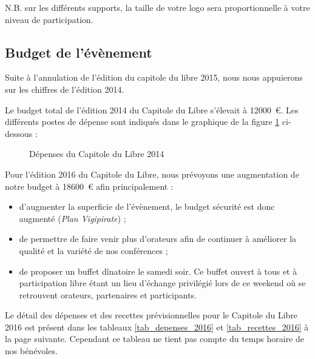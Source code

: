 N.B. sur les différents supports, la taille de votre logo sera proportionnelle à votre niveau de participation.

\newpage

\subsection{Budget de l’évènement}
	
Suite à l'annulation de l'édition du capitole du libre 2015, nous nous appuierons sur les chiffres de l'édition 2014.

Le budget total de l'édition 2014 du Capitole du Libre s'élevait à
 \SI{12000}{\euro}. Les différents postes de dépense sont indiqués dans
 le graphique de la figure \ref{fig_budget} ci-dessous : 

\begin{figure}[h]
\begin{center}
\end{center}
\caption{Dépenses du Capitole du Libre 2014}\label{fig_budget}
\end{figure}


Pour l'édition 2016 du Capitole du Libre, nous prévoyons une augmentation de notre budget à \SI{18600}{\euro} afin principalement :
\begin{itemize}[label=$\bullet$]
\item d'augmenter la superficie de l'évènement, le budget sécurité est donc augmenté (\emph{Plan Vigipirate}) ;
\item de permettre de faire venir plus d'orateurs afin de continuer à améliorer la qualité et la variété de nos conférences ;
\item de proposer un buffet dînatoire le samedi soir. Ce buffet ouvert à tous et à participation libre étant un lieu d'échange privilégié lors de ce weekend où se retrouvent orateurs, partenaires et participants.
\end{itemize}

\Separateur

Le détail des dépenses et des recettes prévisionnelles pour le Capitole du Libre 2016 est présent dans les tableaux \ref{tab_depenses_2016} et \ref{tab_recettes_2016} à la page suivante. Cependant ce tableau ne tient pas compte du temps horaire de nos bénévoles.

